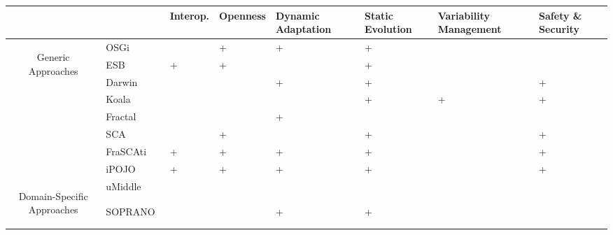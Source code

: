 
\begin{table}[h!]
\begin{tabular}{cm{}|| >{\centering\arraybackslash}m{}| >{\centering\arraybackslash}m{}| >{\centering\arraybackslash}m{}| >{\centering\arraybackslash}m{}| >{\centering}m{}| >{\centering\arraybackslash}m{}|}
 & & {\tiny Interop.} & {\tiny Openness} & {\tiny Dynamic Adaptation} & {\tiny Static Evolution} & {\tiny Variability Management} & {\tiny Safety \& Security}\\
 \hline\hline
 \multirow{7}{7mm}{\begin{sideways}\parbox{25mm}{\small\centering Generic Approaches}\end{sideways}}
 &{\small OSGi~\cite{OSGI:r4}}				&  & + & + & + &  &  \\ 
 &{\small ESB~\cite{Chappell:2004}}								& + & + &  & + &  &  \\
 \cline{2-8}%
 &{\small Darwin~\cite{Georgiadis:2002}}		&  &  & + & + &   & + \\ 
 &{\small Koala~\cite{RobVanOmmering:2000}}	&  &  &   & + & + & + \\
 &{\small Fractal~\cite{Bruneton:2006}}		&  &  & + &   &   &  \\
 \cline{2-8}%
 &{\small SCA~\cite{sca:specs}}				&   & + &  & + &  & +\\
 &{\small FraSCAti~\cite{Melisson:2010}}	 	& + & + & + & + &  & + \\
 &{\small iPOJO~\cite{Escoffier:2007}}		& + & + & + & + &  & + \\
 \hline\hline
 \multirow{9}{7mm}{\begin{sideways}\parbox{30mm}{\small\centering  Domain-Specific Approaches}\end{sideways}} 
 &{\small uMiddle~\cite{Nakazawa:2007}}		&  &  &  &  &  &  \\
 &{\small SOPRANO~\cite{Wolf:2010}}			&  &  & + & + &  &  \\

\end{tabular}
\end{table}
